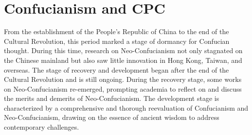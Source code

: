 \documentclass[
]{book}
\begin{document}
\hypertarget{confucianism-and-cpc}{%
\section{Confucianism and CPC}\label{confucianism-and-cpc}}

From the establishment of the People's Republic of China to the end of the Cultural Revolution, this period marked a stage of dormancy for Confucian thought. During this time, research on Neo-Confucianism not only stagnated on the Chinese mainland but also saw little innovation in Hong Kong, Taiwan, and overseas. The stage of recovery and development began after the end of the Cultural Revolution and is still ongoing. During the recovery stage, some works on Neo-Confucianism re-emerged, prompting academia to reflect on and discuss the merits and demerits of Neo-Confucianism. The development stage is characterized by a comprehensive and thorough reevaluation of Confucianism and Neo-Confucianism, drawing on the essence of ancient wisdom to address contemporary challenges.

  
\end{document}
